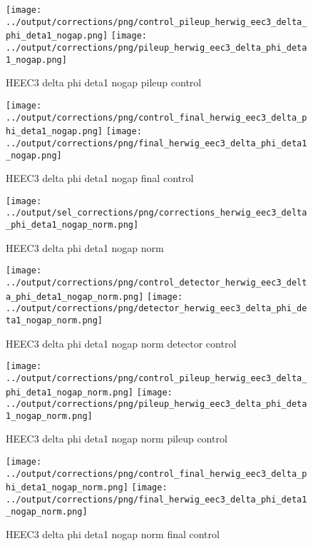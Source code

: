 \documentclass[11pt]{book}
\begin{document}
\begin{figure}[ht]
\centering
\texttt{[image: ../output/corrections/png/control\_pileup\_herwig\_eec3\_delta\_phi\_deta1\_nogap.png]}
\texttt{[image: ../output/corrections/png/pileup\_herwig\_eec3\_delta\_phi\_deta1\_nogap.png]}
\caption{HEEC3 delta phi deta1 nogap pileup control}
\label{fig:HEEC3_delta_phi_deta1_nogap_pileup_control}
\end{figure}


\begin{figure}[ht]
\centering
\texttt{[image: ../output/corrections/png/control\_final\_herwig\_eec3\_delta\_phi\_deta1\_nogap.png]}
\texttt{[image: ../output/corrections/png/final\_herwig\_eec3\_delta\_phi\_deta1\_nogap.png]}
\caption{HEEC3 delta phi deta1 nogap final control}
\label{fig:HEEC3_delta_phi_deta1_nogap_final_control}
\end{figure}


\begin{figure}[ht]
\centering
\texttt{[image: ../output/sel\_corrections/png/corrections\_herwig\_eec3\_delta\_phi\_deta1\_nogap\_norm.png]}
\caption{HEEC3 delta phi deta1 nogap norm}
\label{fig:HEEC3_delta_phi_deta1_nogap_norm}
\end{figure}


\begin{figure}[ht]
\centering
\texttt{[image: ../output/corrections/png/control\_detector\_herwig\_eec3\_delta\_phi\_deta1\_nogap\_norm.png]}
\texttt{[image: ../output/corrections/png/detector\_herwig\_eec3\_delta\_phi\_deta1\_nogap\_norm.png]}
\caption{HEEC3 delta phi deta1 nogap norm detector control}
\label{fig:HEEC3_delta_phi_deta1_nogap_norm_detector_control}
\end{figure}

\begin{figure}[ht]
\centering
\texttt{[image: ../output/corrections/png/control\_pileup\_herwig\_eec3\_delta\_phi\_deta1\_nogap\_norm.png]}
\texttt{[image: ../output/corrections/png/pileup\_herwig\_eec3\_delta\_phi\_deta1\_nogap\_norm.png]}
\caption{HEEC3 delta phi deta1 nogap norm pileup control}
\label{fig:HEEC3_delta_phi_deta1_nogap_norm_pileup_control}
\end{figure}


\begin{figure}[ht]
\centering
\texttt{[image: ../output/corrections/png/control\_final\_herwig\_eec3\_delta\_phi\_deta1\_nogap\_norm.png]}
\texttt{[image: ../output/corrections/png/final\_herwig\_eec3\_delta\_phi\_deta1\_nogap\_norm.png]}
\caption{HEEC3 delta phi deta1 nogap norm final control}
\label{fig:HEEC3_delta_phi_deta1_nogap_norm_final_control}
\end{figure}
\end{document}
